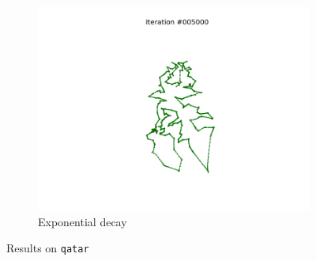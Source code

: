 \documentclass[11pt]{article}
\begin{document}
\begin{figure}
\begin{subfigure}{.33\textwidth}
  \includegraphics[trim={6cm 2cm 6cm 2cm}, clip=true,width=\linewidth]{q_e.png}
  \caption{Exponential decay}
\end{subfigure}
\caption{Results on \texttt{qatar}}
\label{fig:qatar}
\end{figure}
\end{document}

